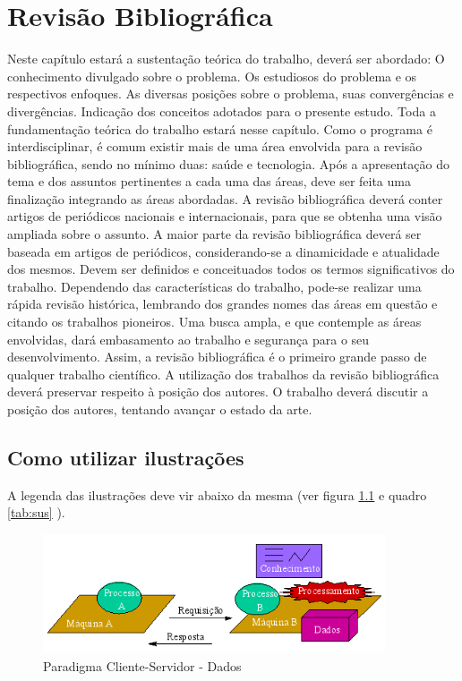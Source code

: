 \chapter{Revis\~ao Bibliogr\'afica}
\label{chap:revbib}

Neste capítulo estará a sustentação teórica do trabalho, deverá ser abordado:
O conhecimento divulgado sobre o problema.
Os estudiosos do problema e os respectivos enfoques.
As diversas posições sobre o problema, suas convergências e divergências.
Indicação dos conceitos adotados para o presente estudo.
Toda a fundamentação teórica do trabalho estará nesse capítulo.
Como o programa é interdisciplinar, é comum existir mais de uma área envolvida para a revisão bibliográfica, sendo no mínimo duas: saúde e tecnologia. Após a apresentação do tema e dos assuntos pertinentes a cada uma das áreas, deve ser feita uma finalização integrando as áreas abordadas.
A revisão bibliográfica deverá conter artigos de periódicos nacionais e internacionais, para que se obtenha uma visão ampliada sobre o assunto. A maior parte da revisão bibliográfica deverá ser baseada em artigos de periódicos, considerando-se a dinamicidade e atualidade dos mesmos. 
Devem ser definidos e conceituados todos os termos significativos do trabalho. Dependendo das características do trabalho, pode-se realizar uma rápida revisão histórica, lembrando dos grandes nomes das áreas em questão e citando os trabalhos pioneiros. Uma busca ampla, e que contemple as áreas envolvidas, dará embasamento ao trabalho e segurança para o seu desenvolvimento. Assim, a revisão bibliográfica é o primeiro grande passo de qualquer trabalho científico.
A utilização dos trabalhos da revisão bibliográfica deverá preservar respeito à posição dos autores. O trabalho deverá discutir a posição dos autores, tentando avançar o estado da arte.

\section{Como utilizar ilustra\c{c}\~{o}es}

A legenda das ilustrações deve vir abaixo da mesma (ver figura \ref{fig:cliente-servidor}  e quadro \ref{tab:sus} ). 

\begin{figure}[htbp]
	\centering
	\includegraphics[width=0.9\textwidth]{./imagens/diagrama-cliente-servidor.png} %
	\caption[Paradigma Cliente-Servidor]{Paradigma Cliente-Servidor - Dados}
	\label{fig:cliente-servidor}
\end{figure}

